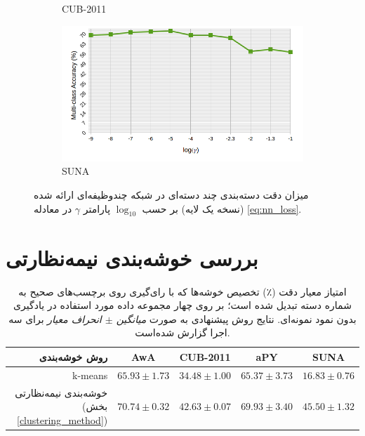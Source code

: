 \begin{figure}[!th]
\begin{subfigure}[b]{0.43\linewidth}
    \caption{CUB-2011}
\end{subfigure}
\begin{subfigure}[b]{0.43\linewidth}
    \includegraphics[width=\linewidth]{images/nn_param_sun}
    \caption{SUNA}
\end{subfigure}
\caption[نمودار تحلیل پارامتر شبکه عصبی]{
میزان دقت دسته‌بندی چند دسته‌ای در شبکه چندوظیفه‌ای ارائه شده (نسخه یک لایه) بر حسب $\log_{10}$ پارامتر $\gamma$ در معادله
\eqref{eq:nn_loss}.
}
\label{fig:nn_param}
\end{figure}




\section{بررسی خوشه‌بندی نیمه‌نظارتی}
\begin{table}[ht]
\centering
\caption[بررسی عمل‌کرد خوشه‌بندی نیمه‌نظارتی پیشنهاتی]{
امتیاز معیار دقت (٪) تخصیص خوشه‌ها که با رای‌گیری روی برچسب‌های صحیح به شماره دسته تبدیل شده است؛ بر روی چهار مجموعه داده مورد استفاده در یادگیری بدون نمود نمونه‌ای. نتایج روش پیشنهادی به صورت
\textit{ میانگین $\pm$ انحراف معیار }
برای سه اجرا گزارش شده‌است.}
\vspace*{2mm}
  \label{tab:clustering}
\begin{tabular}{|r|c|c|c|c|}
\hline
روش خوشه‌بندی & AwA & CUB-2011 & aPY & SUNA \\
\hline
k-means                             &  ${65.93 \pm 1.73}$                 & ${34.48 \pm 1.00}$           & ${65.37 \pm 3.73 }$               & ${16.83 \pm 0.76 }$   \\
\hline
خوشه‌بندی نیمه‌نظارتی (بخش \ref{clustering_method})
                      & \textbf{${70.74\pm 0.32}$}  & \textbf{${42.63\pm 0.07}$} & \textbf{${69.93\pm 3.40}$} & \textbf{ ${45.50 \pm 1.32}$} \\
\hline
\end{tabular}
\vspace{2mm}
\end{table}

